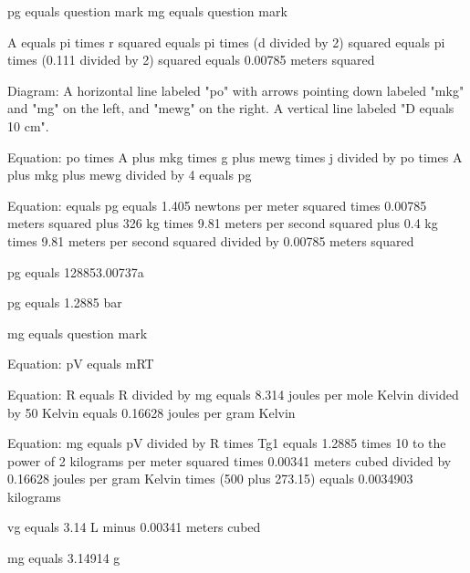 pg equals question mark
mg equals question mark

A equals pi times r squared equals pi times (d divided by 2) squared equals pi times (0.111 divided by 2) squared equals 0.00785 meters squared

Diagram: A horizontal line labeled "po" with arrows pointing down labeled "mkg" and "mg" on the left, and "mewg" on the right. A vertical line labeled "D equals 10 cm".

Equation: po times A plus mkg times g plus mewg times j divided by po times A plus mkg plus mewg divided by 4 equals pg

Equation: equals pg equals 1.405 newtons per meter squared times 0.00785 meters squared plus 326 kg times 9.81 meters per second squared plus 0.4 kg times 9.81 meters per second squared divided by 0.00785 meters squared

pg equals 128853.00737a

pg equals 1.2885 bar

mg equals question mark

Equation: pV equals mRT

Equation: R equals R divided by mg equals 8.314 joules per mole Kelvin divided by 50 Kelvin equals 0.16628 joules per gram Kelvin

Equation: mg equals pV divided by R times Tg1 equals 1.2885 times 10 to the power of 2 kilograms per meter squared times 0.00341 meters cubed divided by 0.16628 joules per gram Kelvin times (500 plus 273.15) equals 0.0034903 kilograms

vg equals 3.14 L minus 0.00341 meters cubed

mg equals 3.14914 g